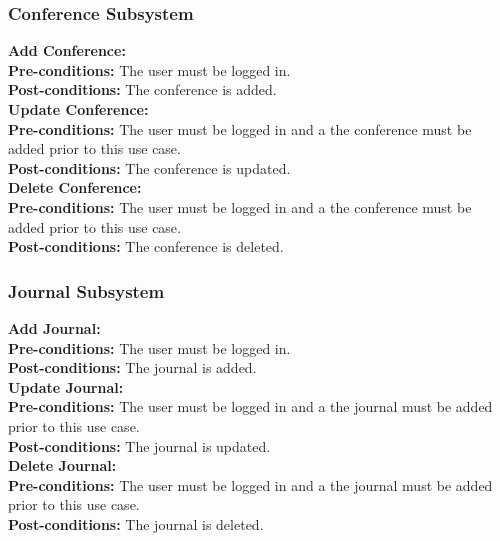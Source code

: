 \documentclass{article}
\begin{document}
			\subsubsection{Conference Subsystem}
				\textbf{Add Conference:}\\
					\indent \textbf{Pre-conditions:} The user must be logged in.\\
					\indent \textbf{Post-conditions:} The conference is added.\\
				\textbf{Update Conference:}\\
					\indent \textbf{Pre-conditions:} The user must be logged in and a the conference must be added prior to this use case.\\
					\indent \textbf{Post-conditions:} The conference is updated.\\
				\textbf{Delete Conference:}\\
					\indent \textbf{Pre-conditions:} The user must be logged in and a the conference must be added prior to this use case.\\
					\indent \textbf{Post-conditions:} The conference is deleted.\\
			\subsubsection{Journal Subsystem}
				\textbf{Add Journal:}\\
					\indent \textbf{Pre-conditions:} The user must be logged in.\\
					\indent \textbf{Post-conditions:} The journal is added.\\
				\textbf{Update Journal:}\\
					\indent \textbf{Pre-conditions:} The user must be logged in and a the journal must be added prior to this use case.\\
					\indent \textbf{Post-conditions:} The journal is updated.\\
				\textbf{Delete Journal:}\\
					\indent \textbf{Pre-conditions:} The user must be logged in and a the journal must be added prior to this use case.\\
					\indent \textbf{Post-conditions:} The journal is deleted.\\
\end{document}

